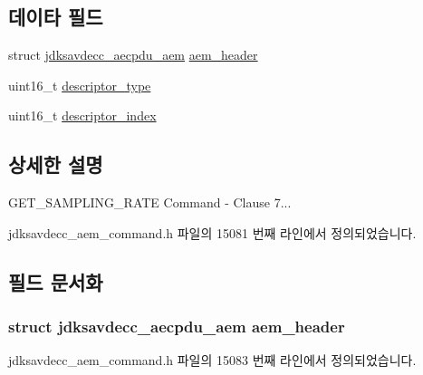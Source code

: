 \subsection*{데이타 필드}
\begin{DoxyCompactItemize}
\item 
struct \hyperlink{structjdksavdecc__aecpdu__aem}{jdksavdecc\+\_\+aecpdu\+\_\+aem} \hyperlink{structjdksavdecc__aem__command__get__sampling__rate_ae1e77ccb75ff5021ad923221eab38294}{aem\+\_\+header}
\item 
uint16\+\_\+t \hyperlink{structjdksavdecc__aem__command__get__sampling__rate_ab7c32b6c7131c13d4ea3b7ee2f09b78d}{descriptor\+\_\+type}
\item 
uint16\+\_\+t \hyperlink{structjdksavdecc__aem__command__get__sampling__rate_a042bbc76d835b82d27c1932431ee38d4}{descriptor\+\_\+index}
\end{DoxyCompactItemize}


\subsection{상세한 설명}
G\+E\+T\+\_\+\+S\+A\+M\+P\+L\+I\+N\+G\+\_\+\+R\+A\+TE Command -\/ Clause 7... 

jdksavdecc\+\_\+aem\+\_\+command.\+h 파일의 15081 번째 라인에서 정의되었습니다.



\subsection{필드 문서화}
\subsubsection[{\texorpdfstring{aem\+\_\+header}{aem_header}}]{\setlength{\rightskip}{0pt plus 5cm}struct {\bf jdksavdecc\+\_\+aecpdu\+\_\+aem} aem\+\_\+header}\hypertarget{structjdksavdecc__aem__command__get__sampling__rate_ae1e77ccb75ff5021ad923221eab38294}{}\label{structjdksavdecc__aem__command__get__sampling__rate_ae1e77ccb75ff5021ad923221eab38294}


jdksavdecc\+\_\+aem\+\_\+command.\+h 파일의 15083 번째 라인에서 정의되었습니다.

